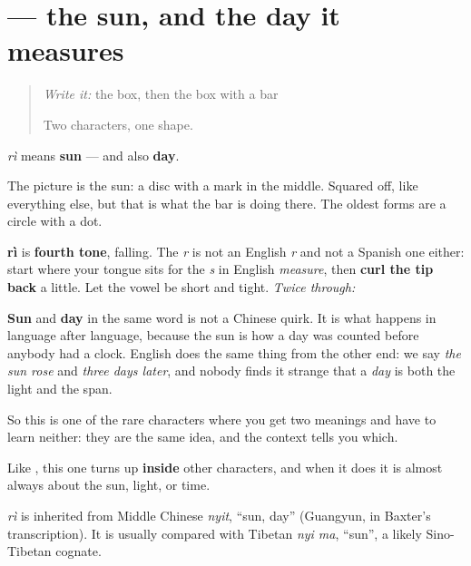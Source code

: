 \section[\texorpdfstring{\zh{日} (rì)}{日 (rì)}]{ — the sun, and the day it measures}

\label{lesson:ZH-C04-ri}



\begin{quote}
\emph{Write it:} the box, then the box with a bar

Two characters, one shape.
\end{quote}

\begin{sounds}
\textbf{} \emph{rì} means \textbf{sun} — and also \textbf{day}.

The picture is the sun: a disc with a mark in the middle. Squared off, like everything else, but that is what the bar is doing there. The oldest forms are a circle with a dot.

\textbf{rì} is \textbf{fourth tone}, falling. The \emph{r} is not an English \emph{r} and not a Spanish one either: start where your tongue sits for the \emph{s} in English \emph{measure}, then \textbf{curl the tip back} a little. Let the vowel be short and tight. \emph{Twice through:}
\end{sounds}

\begin{culture}
\textbf{Sun} and \textbf{day} in the same word is not a Chinese quirk. It is what happens in language after language, because the sun is how a day was counted before anybody had a clock. English does the same thing from the other end: we say \emph{the sun rose} and \emph{three days later}, and nobody finds it strange that a \emph{day} is both the light and the span.

So this is one of the rare characters where you get two meanings and have to learn neither: they are the same idea, and the context tells you which.

Like , this one turns up \textbf{inside} other characters, and when it does it is almost always about the sun, light, or time.
\end{culture}

\begin{cousinweb}
\textbf{} \emph{rì} is inherited from Middle Chinese \emph{nyit}, \textquotedblleft{}sun, day\textquotedblright{} (Guangyun, in Baxter's transcription). It is usually compared with Tibetan \emph{nyi ma}, \textquotedblleft{}sun\textquotedblright{}, a likely Sino-Tibetan cognate.
\end{cousinweb}

